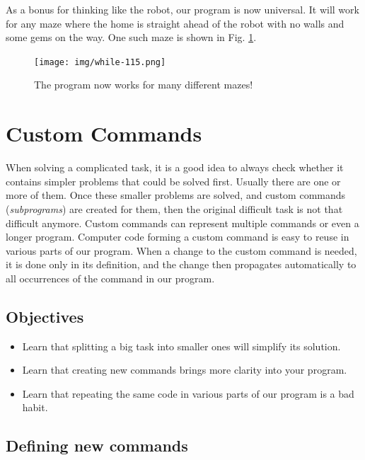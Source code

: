As a bonus for thinking like the robot, our program is now universal. It will work
for any maze where the home is straight ahead of the robot with no walls and 
some gems on the way. One such maze is shown in Fig. \ref{fig:while-115}.
\newpage
\begin{figure}[!ht]
\begin{center}
\texttt{[image: img/while-115.png]}
\vspace{-0mm}
\caption{The program now works for many different mazes!}
\label{fig:while-115}
\vspace{-6mm}
\end{center}
\end{figure}
\noindent



\section{Custom Commands} \label{sec:newcom}

When solving a complicated task, it is a good idea to always check whether 
it contains simpler problems that could be solved first. Usually there are one 
or more of them. Once these smaller problems are solved, and custom commands 
({\em subprograms}) are created for them, then the original difficult task 
is not that difficult anymore. Custom commands can represent multiple commands 
or even a longer program. Computer code forming a custom command is
easy to reuse in various parts of our program. When a change to the custom 
command is needed, it is done only in its definition, and the change then
propagates automatically to all occurrences of the command in our program.

\subsection{Objectives} 
 
\begin{itemize}
\item Learn that splitting a big task into smaller ones will simplify its solution. 
\item Learn that creating new commands brings more clarity into your program.
\item Learn that repeating the same code in various parts of our program is a bad habit. 
\end{itemize}


\subsection{Defining new commands}

